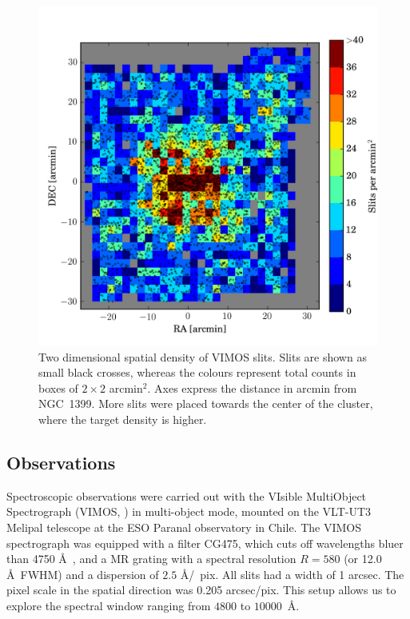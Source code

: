 \documentclass[useAMS,usenatbib]{mn2e}
\begin{document}
\begin{figure}
\centering
\includegraphics[width=\columnwidth]{figures/slitdist.png} 
\caption{Two dimensional spatial density of VIMOS slits. Slits are shown as 
small black crosses, whereas the colours represent total counts in boxes of 
$2\times2$ arcmin$^2$. Axes express the distance in arcmin from NGC~1399. More 
slits were placed towards the center of the cluster, where the target density 
is higher. }
\label{fig:2dsplit}
\end{figure}

\subsection{Observations}
\label{sec:observations}

Spectroscopic observations were carried out with the VIsible MultiObject 
Spectrograph (VIMOS, \citealt{LeFevre}) in multi-object mode, mounted on the 
VLT-UT3 Melipal telescope at the ESO Paranal observatory in Chile. 
The VIMOS spectrograph was equipped with a filter CG475, which cuts off 
wavelengths bluer than 4750 \AA\ , and a MR grating with a spectral resolution 
$R = 580$ (or 12.0 \AA\ FWHM) and a dispersion of $2.5$ \AA /~pix. All slits 
had a width of 1 arcsec. The pixel scale in the spatial direction was 0.205 
arcsec/pix. This setup allows us to explore the spectral window ranging from 
$4800$ to $10000$~\AA. 
\end{document}
